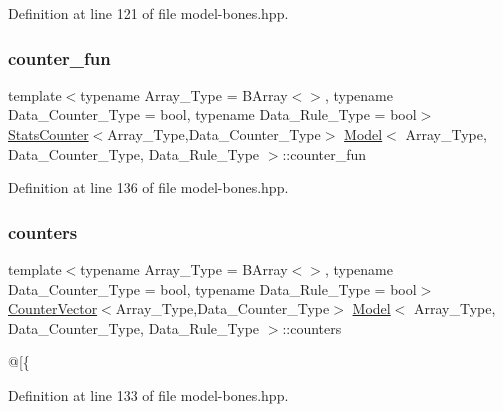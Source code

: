 Definition at line 121 of file model-\/bones.\+hpp.

\mbox{\label{class_model_a2bb5ec8af1a49bcb2da6c5f9f2374b15}} 
\subsubsection{\texorpdfstring{counter\+\_\+fun}{counter\_fun}}
{\footnotesize\ttfamily template$<$typename Array\+\_\+\+Type  = B\+Array$<$$>$, typename Data\+\_\+\+Counter\+\_\+\+Type  = bool, typename Data\+\_\+\+Rule\+\_\+\+Type  = bool$>$ \\
\hyperlink{class_stats_counter}{Stats\+Counter}$<$Array\+\_\+\+Type,Data\+\_\+\+Counter\+\_\+\+Type$>$ \hyperlink{class_model}{Model}$<$ Array\+\_\+\+Type, Data\+\_\+\+Counter\+\_\+\+Type, Data\+\_\+\+Rule\+\_\+\+Type $>$\+::counter\+\_\+fun}



Definition at line 136 of file model-\/bones.\+hpp.

\mbox{\label{class_model_aeabec424c8fa4f412a74ec6fd4622bac}} 
\subsubsection{\texorpdfstring{counters}{counters}}
{\footnotesize\ttfamily template$<$typename Array\+\_\+\+Type  = B\+Array$<$$>$, typename Data\+\_\+\+Counter\+\_\+\+Type  = bool, typename Data\+\_\+\+Rule\+\_\+\+Type  = bool$>$ \\
\hyperlink{class_counter_vector}{Counter\+Vector}$<$Array\+\_\+\+Type,Data\+\_\+\+Counter\+\_\+\+Type$>$ \hyperlink{class_model}{Model}$<$ Array\+\_\+\+Type, Data\+\_\+\+Counter\+\_\+\+Type, Data\+\_\+\+Rule\+\_\+\+Type $>$\+::counters}



@\mbox{[}\{ 



Definition at line 133 of file model-\/bones.\+hpp.

\mbox{\label{class_model_ae9cd143269b07c9bde44855d1974f3f5}} 

